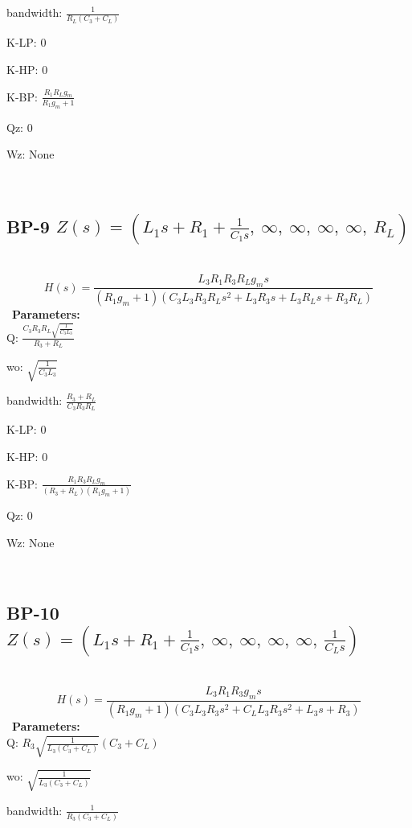 \documentclass{article}
\begin{document}
bandwidth: $\frac{1}{R_{L} \left(C_{3} + C_{L}\right)}$\ 

K-LP: $0$\ 

K-HP: $0$\ 

K-BP: $\frac{R_{1} R_{L} g_{m}}{R_{1} g_{m} + 1}$\ 

Qz: $0$\ 

Wz: $\text{None}$\ 

\ 

\subsection{BP-9 $Z(s) = \left( L_{1} s + R_{1} + \frac{1}{C_{1} s}, \  \infty, \  \infty, \  \infty, \  \infty, \  R_{L}\right)$ } \ 
\textbf{\[H(s) = \frac{L_{3} R_{1} R_{3} R_{L} g_{m} s}{\left(R_{1} g_{m} + 1\right) \left(C_{3} L_{3} R_{3} R_{L} s^{2} + L_{3} R_{3} s + L_{3} R_{L} s + R_{3} R_{L}\right)}\] } \ 
\textbf{Parameters:}\\ 

Q: $\frac{C_{3} R_{3} R_{L} \sqrt{\frac{1}{C_{3} L_{3}}}}{R_{3} + R_{L}}$\ 

wo: $\sqrt{\frac{1}{C_{3} L_{3}}}$\ 

bandwidth: $\frac{R_{3} + R_{L}}{C_{3} R_{3} R_{L}}$\ 

K-LP: $0$\ 

K-HP: $0$\ 

K-BP: $\frac{R_{1} R_{3} R_{L} g_{m}}{\left(R_{3} + R_{L}\right) \left(R_{1} g_{m} + 1\right)}$\ 

Qz: $0$\ 

Wz: $\text{None}$\ 

\ 

\subsection{BP-10 $Z(s) = \left( L_{1} s + R_{1} + \frac{1}{C_{1} s}, \  \infty, \  \infty, \  \infty, \  \infty, \  \frac{1}{C_{L} s}\right)$ } \ 
\textbf{\[H(s) = \frac{L_{3} R_{1} R_{3} g_{m} s}{\left(R_{1} g_{m} + 1\right) \left(C_{3} L_{3} R_{3} s^{2} + C_{L} L_{3} R_{3} s^{2} + L_{3} s + R_{3}\right)}\] } \ 
\textbf{Parameters:}\\ 

Q: $R_{3} \sqrt{\frac{1}{L_{3} \left(C_{3} + C_{L}\right)}} \left(C_{3} + C_{L}\right)$\ 

wo: $\sqrt{\frac{1}{L_{3} \left(C_{3} + C_{L}\right)}}$\ 

bandwidth: $\frac{1}{R_{3} \left(C_{3} + C_{L}\right)}$\ 
\end{document}
